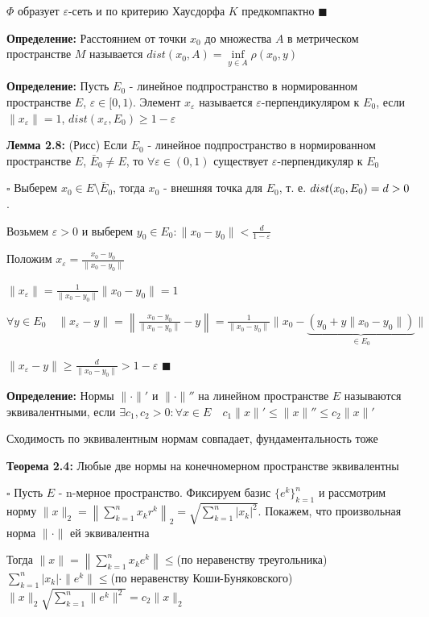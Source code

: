 \documentclass[a4paper]{report}
\newcommand*{\hm}[1]{#1\nobreak\discretionary{}%
            {\hbox{$\mathsurround=0pt #1$}}{}}
\begin{document}
$\Phi$ образует $\varepsilon$-сеть и по критерию Хаусдорфа $K$ предкомпактно $\blacksquare$
\bigskip

\noindent\textbf{Определение:} Расстоянием от точки $x_0$ до множества $A$ в метрическом пространстве $M$ называется 
$dist(x_0,A)=\inf\limits_{y\in A}\rho(x_0,y)$
\bigskip

\noindent\textbf{Определение:} Пусть $E_0$ - линейное подпространство в нормированном пространстве $E$, $\varepsilon\in[0,1)$. 
Элемент $x_\varepsilon$ называется $\varepsilon$-перпендикуляром к $E_0$, если $\|x_\varepsilon\|=1$, $dist(x_\varepsilon,
E_0)\ge1-\varepsilon$
\bigskip

\noindent\textbf{Лемма 2.8:} (Рисс) Если $E_0$ - линейное подпространство в нормированном пространстве $E$, $\bar E_0\ne E$, 
то $\forall\varepsilon\in(0,1)$ существует $\varepsilon$-перпендикуляр к $E_0$

\noindent $\square$ Выберем $x_0\in E\setminus\bar E_0$, тогда $x_0$ - внешняя точка для $E_0$, т. е. $dist(x_0,E_0)\hm=d>0$.

Возьмем $\varepsilon>0$ и выберем $y_0\in E_0\colon\|x_0-y_0\|<\frac{d}{1-\varepsilon}$

Положим $x_\varepsilon=\frac{x_0-y_0}{\|x_0-y_0\|}$

$\|x_\varepsilon\|=\frac{1}{\|x_0-y_0\|}\|x_0-y_0\|=1$

$\forall y\in E_0\quad\|x_\varepsilon-y\|=\left\|\frac{x_0-y_0}{\|x_0-y_0\|}-y\right\|=\frac{1}{\|x_0-y_0\|}\|x_0-\underbrace{
(y_0+y\|x_0-y_0\|)}_{\in E_0}\|$

$\|x_\varepsilon-y\|\ge\frac{d}{\|x_0-y_0\|}>1-\varepsilon$ $\blacksquare$
\bigskip

\noindent\textbf{Определение:} Нормы $\|\cdot\|'$ и $\|\cdot\|''$ на линейном пространстве $E$ называются эквивалентными, 
если $\exists c_1,c_2>0\colon\forall x\in E\quad c_1\|x\|'\le\|x\|''\le c_2\|x\|'$
\bigskip

Сходимость по эквивалентным нормам совпадает, фундаментальность тоже
\bigskip

\noindent\textbf{Теорема 2.4:} Любые две нормы на конечномерном пространстве эквивалентны

\noindent $\square$ Пусть $E$ - n-мерное пространство. Фиксируем базис $\{e^k\}_{k=1}^n$ и рассмотрим норму $\|x\|_2=
\left\|\sum\limits_{k=1}^n x_k r^k\right\|_2=\sqrt{\sum\limits_{k=1}^n|x_k|^2}$. Покажем, что произвольная норма $\|\cdot\|$ ей 
эквивалентна

Тогда $\|x\|=\left\|\sum\limits_{k=1}^n x_k e^k\right\|\le$(по неравенству треугольника)$\sum\limits_{k=1}^n|x_k|\cdot
\|e^k\|\le$(по неравенству Коши-Буняковского)$\|x\|_2\sqrt{\sum\limits_{k=1}^n\|e^k\|^2}=c_2\|x\|_2$
\end{document}
